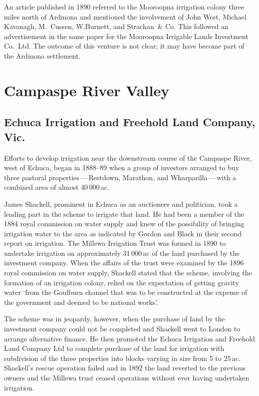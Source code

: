 An article published in 1890 referred to the Mooroopna irrigation
colony three miles north of Ardmona and mentioned the involvement of
John West, Michael Kavanagh, M.~Cussen, W.Burnett, and Strachan~\& Co.
This followed an advertisement in the same paper for the Mooroopna
Irrigable Lands Investment Co.\ Ltd. The outcome of this venture is
not clear; it may have become part of the Ardmona
settlement.

\section*{Campaspe River Valley}

\subsection*{Echuca Irrigation and Freehold Land Company, Vic.}

Efforts to develop irrigation near the downstream course of the
Campaspe River, west of Echuca, began in 1888--89 when a group of
investors arranged to buy three pastoral properties\,---\,Restdown,
Marathon, and Wharparilla\,---\,with a combined area of almost
40\,000\,ac.

James Shackell, prominent in Echuca as an auctioneer and politician,
took a leading part in the scheme to irrigate that land.  He had been
a member of the 1884 royal commission on water supply and knew of the
possibility of bringing irrigation water to the area as indicated by
Gordon and Black in their second report on irrigation.  The Millewa
Irrigation Trust was formed in 1890 to undertake irrigation on
approximately 31\,000\,ac of the land purchased by the investment
company.  When the affairs of the trust were examined by the 1896
royal commission on water supply, Shackell stated that the scheme,
involving the formation of an irrigation colony, relied on the
expectation of getting gravity water `from the Goulburn channel that
was to be constructed at the expense of the government and deemed to
be national works'.

The scheme was in jeopardy, however, when the purchase of land by the
investment company could not be completed and Shackell went to London
to arrange alternative finance.  He then promoted the Echuca
Irrigation and Freehold Land Company Ltd to complete purchase of the
land for irrigation with subdivision of the three properties into
blocks varying in size from 5 to 25\,ac.  Shackell's rescue operation
failed and in 1892 the land reverted to the previous owners and the
Millewa trust ceased operations without ever having undertaken
irrigation.

